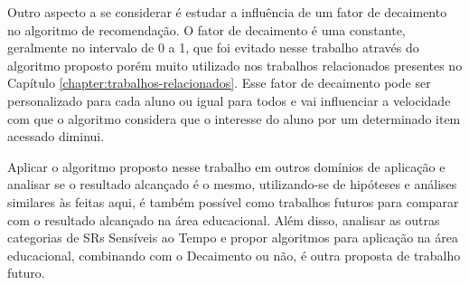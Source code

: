Outro aspecto a se considerar é estudar a influência de um fator de decaimento no algoritmo de recomendação. O fator de
decaimento é uma constante, geralmente no intervalo de 0 a 1, que foi evitado nesse trabalho através do algoritmo proposto
porém muito utilizado nos trabalhos relacionados presentes no Capítulo \ref{chapter:trabalhos-relacionados}. Esse
fator de decaimento pode ser personalizado para cada aluno ou igual para todos e vai influenciar a velocidade com que o
algoritmo considera que o interesse do aluno por um determinado item acessado diminui.

Aplicar o algoritmo proposto nesse trabalho em outros domínios de aplicação e analisar se o resultado alcançado é o mesmo,
utilizando-se de hipóteses e análises similares às feitas aqui, é também possível como trabalhos futuros para comparar
com o resultado alcançado na área educacional. Além disso, analisar as outras categorias de SRs Sensíveis ao Tempo e
propor algoritmos para aplicação na área educacional, combinando com o Decaimento ou não, é outra proposta de trabalho
futuro.
